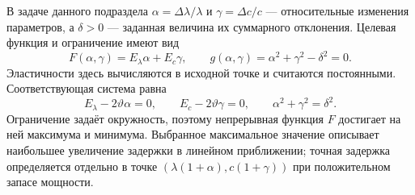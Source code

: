 \documentclass[12pt,a4paper]{article}
\begin{document}
В задаче данного подраздела $\alpha=\Delta\lambda/\lambda$ и
$\gamma=\Delta c/c$ --- относительные изменения параметров,
а $\delta>0$ --- заданная величина их суммарного отклонения.
Целевая функция и ограничение имеют вид
\[
F(\alpha,\gamma)=E_\lambda\alpha+E_c\gamma,\qquad
 g(\alpha,\gamma)=\alpha^2+\gamma^2-\delta^2=0.
\]
Эластичности здесь вычисляются в исходной точке и считаются постоянными.
Соответствующая система равна
\[
E_\lambda-2\vartheta\alpha=0,\qquad
E_c-2\vartheta\gamma=0,\qquad
\alpha^2+\gamma^2=\delta^2.
\]
Ограничение задаёт окружность, поэтому непрерывная функция $F$ достигает
на ней максимума и минимума. Выбранное максимальное значение описывает
наибольшее увеличение задержки в линейном приближении;
точная задержка определяется отдельно в точке
$(\lambda(1+\alpha),c(1+\gamma))$ при положительном запасе мощности.
\end{document}
